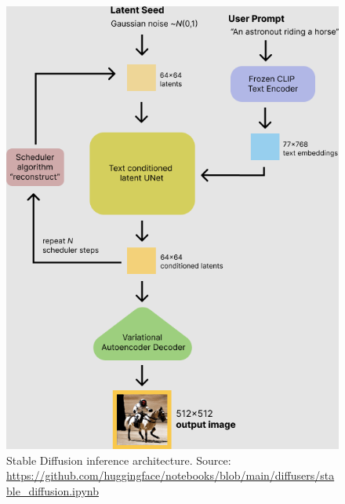 \begin{figure}[ht]
    \centering
    \includegraphics[width=0.6\linewidth]{images/diffusion/stable_diffusion.png}
    \caption{Stable Diffusion inference architecture. Source: \url{https://github.com/huggingface/notebooks/blob/main/diffusers/stable_diffusion.ipynb}}
    \label{fig:stable_diffusion}
\end{figure}